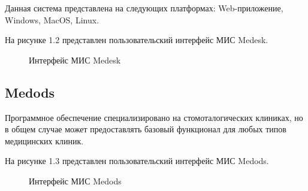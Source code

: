 Данная система представлена на следующих платформах: Web-приложение, Windows, MacOS, Linux.

На рисунке 1.2 представлен пользовательский интерфейс МИС Medesk.

\begin{figure}[!h]
	\caption{Интерфейс МИС Medesk}
\end{figure}

\subsection*{Medods}
 
Программное обеспечение специализировано на стомоталогических клиниках, но в общем случае может предоставлять базовый функционал для любых типов медицинских клиник. 

На рисунке 1.3 представлен пользовательский интерфейс МИС Medods.

\begin{figure}[!h]
	\caption{Интерфейс МИС Medods}
\end{figure}

